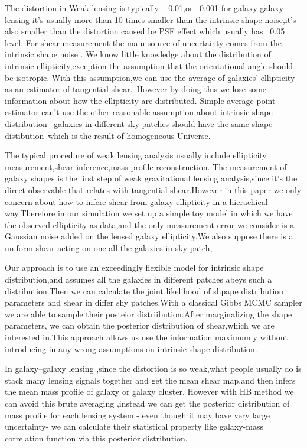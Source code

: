 \documentclass[useAMS,usenatbib]{mn2e}
\begin{document}
The distortion in Weak lensing is typically ~ 0.01,or ~0.001 for
galaxy-galaxy lensing it's usually more than 10 times smaller than
the intrinsic shape noise,it's also smaller than the distortion caused
be PSF effect which usually has ~0.05 level. For shear measurement
the main source of uncertainty comes from the intrinsic shape noise
. We know little knowledge about the distribution of intrinsic ellipticity,exception
the assumption that the orientational angle should be isotropic. With
this assumption,we can use the average of galaxies' ellipticity as
an estimator of tangential shear.--However by doing this we lose some
information about how the ellipticity are distributed. Simple average
point estimator can't use the other reasonable assumption about intrinsic
shape distribution --galaxies in different sky patches should have
the same shape distibution--which is the result of homogeneous Universe.

The typical procedure of weak lensing analysis usually include ellipticity
measurement,shear inference,mass profile reconstruction. The measurement
of galaxy shapes is the first step of weak gravitational lensing analysis,since
it's the direct observable that relates with tangential shear.However
in this paper we only concern about how to infere shear from galaxy
ellipticity in a hierachical way.Therefore in our simulation we set
up a simple toy model in which we have the observed ellipticity as
data,and the only measurement error we consider is a Gaussian noise
added on the lensed galaxy ellipticity.We also suppose there is a uniform shear
acting on one all the galaxies in sky patch,

Our approach is to use an exceedingly flexible model for intrinsic
shape distribution,and assumes all the galaxies in different patches
abeys such a distribution.Then we can calculate the joint likelihood
of shpape distribution parameters and shear in differ shy patches.With
a classical Gibbs MCMC sampler we are able to sample their posteior
distriibution.After marginalizing the shape parameters, we can obtain
the posterior distribution of shear,which we are interested in.This
approach allows us use the information maximumly without introducing
in any wrong assumptions on intrinsic shape distribution.

In galaxy--galaxy lensing ,since the distortion is so weak,what people
usually do is stack many lensing signals together and get the mean
shear map,and then infers the mean mass profile of galaxy or galaxy
cluster. However with HB method we can avoid this brute averaging
,instead we can get the posterior distribution of mass profile for
each lensing system - even though it may have very large uncertainty- we
can calculate their statistical property like galaxy-mass correlation
function via this posterior distribution.
\end{document}
